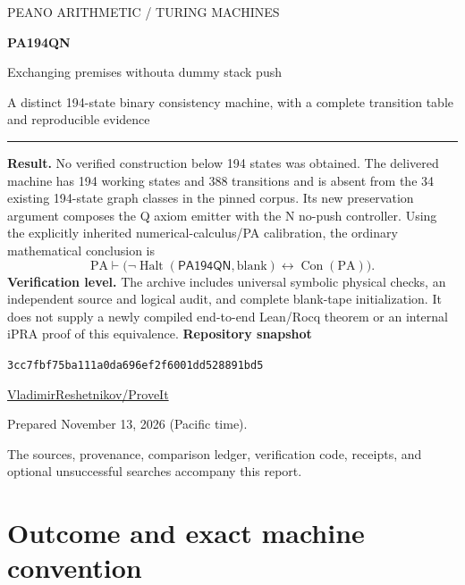 \documentclass[11pt,letterpaper]{article}
\newcommand{\PA}{\mathrm{PA}}
\newcommand{\Con}{\operatorname{Con}}
\newcommand{\Halt}{\operatorname{Halt}}
\newcommand{\M}{\ensuremath{\mathsf{PA194QN}}}
\newcommand{\snap}{\texttt{3cc7fbf75ba111a0da696ef2f6001dd528891bd5}}
\begin{document}
\hypersetup{pageanchor=false}
\begin{titlepage}
\vspace*{0.5in}
{\Large\color{teal}PEANO ARITHMETIC / TURING MACHINES}\par
\vspace{0.35in}
{\Huge\bfseries\color{navy}PA194QN}\par
\vspace{0.15in}
{\LARGE Exchanging premises without\newline a dummy stack push}\par
\vspace{0.4in}
{\large A distinct 194-state binary consistency machine,\newline
with a complete transition table and reproducible evidence}\par
\vspace{0.35in}
\rule{\textwidth}{0.7pt}
\textbf{Result.} No verified construction below 194 states was obtained.
The delivered machine has 194 working states and 388 transitions and is
absent from the 34 existing 194-state graph classes in the pinned corpus.
Its new preservation argument composes the Q axiom emitter with the N
no-push controller. Using the explicitly inherited numerical-calculus/PA
calibration, the ordinary mathematical conclusion is
\[
\boxed{\PA\vdash\bigl(\neg\Halt(\M,\mathrm{blank})
                         \leftrightarrow\Con(\PA)\bigr).}
\]
\textbf{Verification level.} The archive includes universal symbolic physical
checks, an independent source and logical audit, and complete blank-tape
initialization. It does not supply a newly compiled end-to-end Lean/Rocq
theorem or an internal iPRA proof of this equivalence.
\vfill
\textbf{Repository snapshot}\par
\snap\par
\href{https://github.com/VladimirReshetnikov/ProveIt}{VladimirReshetnikov/ProveIt}\par
\vspace{0.2in}
Prepared November 13, 2026 (Pacific time).\par
The sources, provenance, comparison ledger, verification code, receipts,
and optional unsuccessful searches accompany this report.
\end{titlepage}
\hypersetup{pageanchor=true}
\tableofcontents
\newpage
{}

\section{Outcome and exact machine convention}
\end{document}
